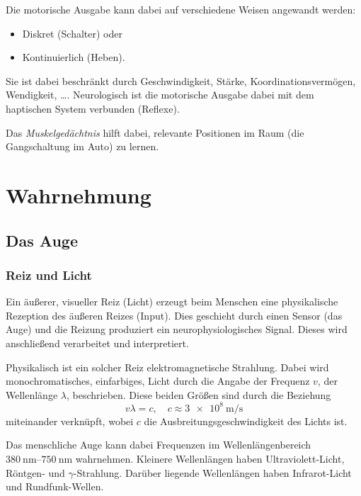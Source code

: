 				Die motorische Ausgabe kann dabei auf verschiedene Weisen angewandt werden:
				\begin{itemize}
					\item Diskret (Schalter) oder
					\item Kontinuierlich (Heben).
				\end{itemize}
				Sie ist dabei beschränkt durch Geschwindigkeit, Stärke, Koordinationsvermögen, Wendigkeit, \dots. Neurologisch ist die motorische Ausgabe dabei mit dem haptischen System verbunden (Reflexe).

				Das \emph{Muskelgedächtnis} hilft dabei, relevante Positionen im Raum (\zB die Gangschaltung im Auto) zu lernen.

	\section{Wahrnehmung}
		\subsection{Das Auge}
			\subsubsection{Reiz und Licht}
				Ein äußerer, visueller Reiz (Licht) erzeugt beim Menschen eine physikalische Rezeption des äußeren Reizes (Input). Dies geschieht durch einen Sensor (\bspw das Auge) und die Reizung produziert ein neurophysiologisches Signal. Dieses wird anschließend verarbeitet und interpretiert.

				Physikalisch ist ein solcher Reiz elektromagnetische Strahlung. Dabei wird monochromatisches, \dh einfarbiges, Licht durch die Angabe der Frequenz \(v\), \bzw der Wellenlänge \(\lambda\), beschrieben. Diese beiden Größen sind durch die Beziehung
				\begin{equation*}
					v \lambda = c, \quad c \approx \SI{3e8}{\meter\per\second}
				\end{equation*}
				miteinander verknüpft, wobei \(c\) die Ausbreitungsgeschwindigkeit des Lichts ist.

				Das menschliche Auge kann dabei Frequenzen im Wellenlängenbereich \( \SIrange{380}{750}{\nano\meter} \) wahrnehmen. Kleinere Wellenlängen haben \zB Ultraviolett-Licht, Röntgen- und \(\gamma\)-Strahlung. Darüber liegende Wellenlängen haben \zB Infrarot-Licht und Rundfunk-Wellen.

